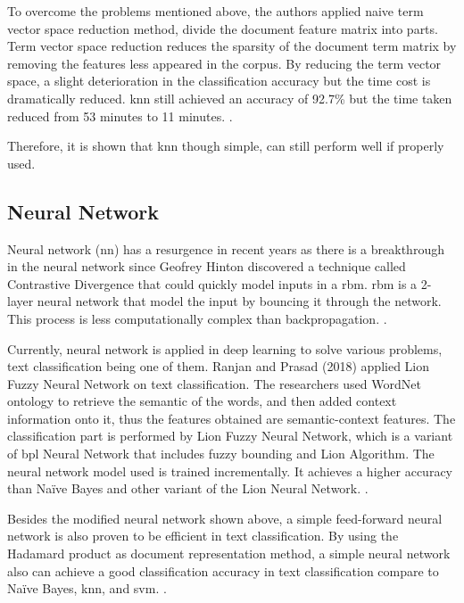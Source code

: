 To overcome the problems mentioned above, the authors applied naive term vector space reduction method, divide the document feature matrix into parts. Term vector space reduction reduces 
the sparsity of the document term matrix by removing the features less appeared in the corpus. By reducing the term vector space, a slight deterioration in the classification accuracy but the time cost is dramatically reduced. \ac{knn} still achieved an accuracy of 92.7\% but the time taken reduced from 53 minutes to 11 minutes. \cite{knnVectorSpaceReduction}.

Therefore, it is shown that \ac{knn} though simple, can still perform well if properly used.\\


\subsection{Neural Network}
Neural network (\ac{nn}) has a resurgence in recent years as there is a breakthrough in the neural network since Geofrey Hinton discovered a technique called Contrastive Divergence that could quickly model inputs in a \ac{rbm}. \Ac{rbm} is a 2-layer neural network that model the input by bouncing it through the network. This process is less computationally complex than backpropagation. \cite{nnHinton}.
	
Currently, neural network is applied in deep learning to solve various problems, text classification being one of them. Ranjan and Prasad (2018) applied Lion Fuzzy Neural Network on text classification. The researchers used WordNet ontology to retrieve the semantic of the words, and then added context information onto it, thus the features obtained are semantic-context features. The classification part is performed by Lion Fuzzy Neural Network, which is a variant of \ac{bpl} Neural Network that includes fuzzy bounding and Lion Algorithm. The neural network model used is trained incrementally. It achieves a higher accuracy than Naïve Bayes and other variant of the Lion Neural Network. \cite{lionNn}.
	
Besides the modified neural network shown above, a simple feed-forward neural network is also proven to be efficient in text classification. By using the Hadamard product as document representation method, a simple neural network also can achieve a good classification accuracy in text classification compare to Naïve Bayes, \ac{knn}, and \ac{svm}. \cite{oneNn}.\\
	

